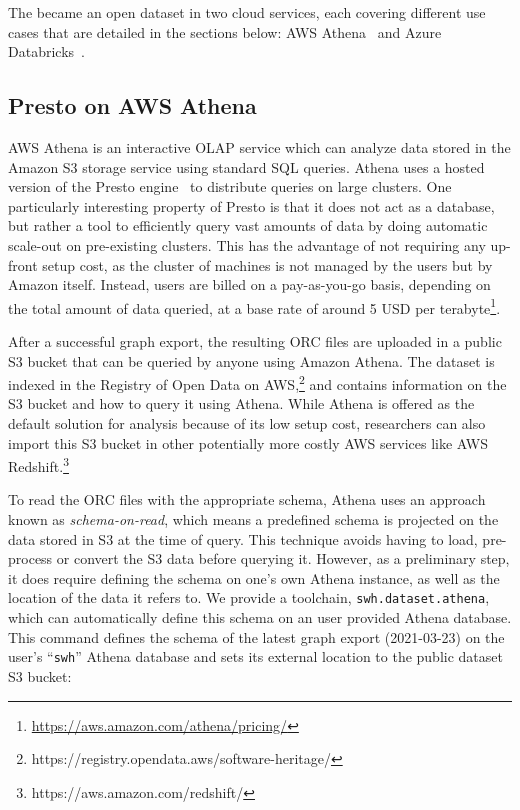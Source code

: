 The \SWHGD{} became an open dataset in two cloud services, each covering
different use cases that are detailed in the sections below: AWS
Athena~\cite{website-amazon-athena} and Azure
Databricks~\cite{website-azure-databricks}.

\subsection{Presto on AWS Athena}

AWS Athena is an interactive OLAP service which can analyze data stored in
the Amazon S3 storage service using standard SQL queries. Athena uses a hosted
version of the Presto engine~\cite{sethi2019presto} to distribute queries on
large clusters.  One particularly interesting property of Presto is that it
does not act as a database, but rather a tool to efficiently query vast amounts
of data by doing automatic scale-out on pre-existing clusters. This has the
advantage of not requiring any up-front setup cost, as the cluster of machines
is not managed by the users but by Amazon itself. Instead, users are billed on
a pay-as-you-go basis, depending on the total amount of data queried, at a base
rate of around 5 USD per
terabyte\footnote{\url{https://aws.amazon.com/athena/pricing/}}.

After a successful graph export, the resulting ORC files are uploaded in a public
S3 bucket that can be queried by anyone using Amazon Athena. The dataset is
indexed in the Registry of Open Data on
AWS,\footnote{https://registry.opendata.aws/software-heritage/} and contains
information on the S3 bucket and how to query it using Athena. While Athena is
offered as the default solution for analysis because of its low setup cost,
researchers can also import this S3 bucket in other potentially more costly AWS
services like AWS Redshift.\footnote{https://aws.amazon.com/redshift/}

To read the ORC files with the appropriate schema, Athena uses an approach
known as \emph{schema-on-read}, which means a predefined schema is projected on
the data stored in S3 at the time of query. This technique avoids having to
load, pre-process or convert the S3 data before querying it. However, as a
preliminary step, it does require defining the schema on one's own Athena
instance, as well as the location of the data it refers to. We provide a
toolchain, \texttt{swh.dataset.athena}, which can automatically define this
schema on an user provided Athena database. This command defines the schema of
the latest graph export (2021-03-23) on the user's ``\texttt{swh}'' Athena
database and sets its external location to the public dataset S3 bucket:

